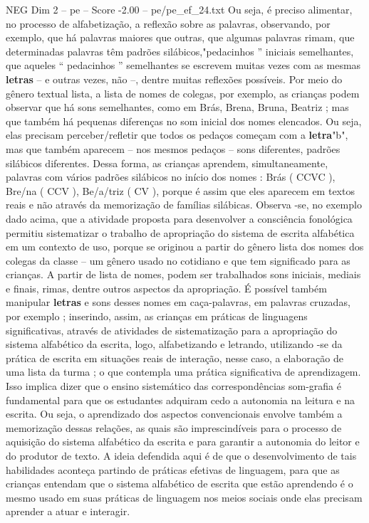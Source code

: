 \begin{textsample}{NEG Dim 2 – pe – Score -2.00 – pe/pe\_ef\_24.txt}
Ou seja, é preciso alimentar, no processo de alfabetização, a reflexão sobre as palavras, observando, por exemplo, que há palavras maiores que outras, que algumas palavras rimam, que determinadas palavras têm padrões silábicos,"pedacinhos ” iniciais semelhantes, que aqueles “ pedacinhos ” semelhantes se escrevem muitas vezes com as mesmas \textbf{letras} – e outras vezes, não –, dentre muitas reflexões possíveis.
Por meio do gênero textual lista, a lista de nomes de colegas, por exemplo, as crianças podem observar que há sons semelhantes, como em Brás, Brena, Bruna, Beatriz ; mas que também há pequenas diferenças no som inicial dos nomes elencados.
Ou seja, elas precisam perceber/refletir que todos os pedaços começam com a \textbf{letra}"b", mas que também aparecem – nos mesmos pedaços – sons diferentes, padrões silábicos diferentes.
Dessa forma, as crianças aprendem, simultaneamente, palavras com vários padrões silábicos no início dos nomes : Brás ( CCVC ), Bre/na ( CCV ), Be/a/triz ( CV ), porque é assim que eles aparecem em textos reais e não através da memorização de famílias silábicas.
Observa -se, no exemplo dado acima, que a atividade proposta para desenvolver a consciência fonológica permitiu sistematizar o trabalho de apropriação do sistema de escrita alfabética em um contexto de uso, porque se originou a partir do gênero lista dos nomes dos colegas da classe – um gênero usado no cotidiano e que tem significado para as crianças.
A partir de lista de nomes, podem ser trabalhados sons iniciais, mediais e finais, rimas, dentre outros aspectos da apropriação.
É possível também manipular \textbf{letras} e sons desses nomes em caça-palavras, em palavras cruzadas, por exemplo ; inserindo, assim, as crianças em práticas de linguagens significativas, através de atividades de sistematização para a apropriação do sistema alfabético da escrita, logo, alfabetizando e letrando, utilizando -se da prática de escrita em situações reais de interação, nesse caso, a elaboração de uma lista da turma ; o que contempla uma prática significativa de aprendizagem.
Isso implica dizer que o ensino sistemático das correspondências som-grafia é fundamental para que os estudantes adquiram cedo a autonomia na leitura e na escrita.
Ou seja, o aprendizado dos aspectos convencionais envolve também a memorização dessas relações, as quais são imprescindíveis para o processo de aquisição do sistema alfabético da escrita e para garantir a autonomia do leitor e do produtor de texto.
A ideia defendida aqui é de que o desenvolvimento de tais habilidades aconteça partindo de práticas efetivas de linguagem, para que as crianças entendam que o sistema alfabético de escrita que estão aprendendo é o mesmo usado em suas práticas de linguagem nos meios sociais onde elas precisam aprender a atuar e interagir.

\end{textsample}
